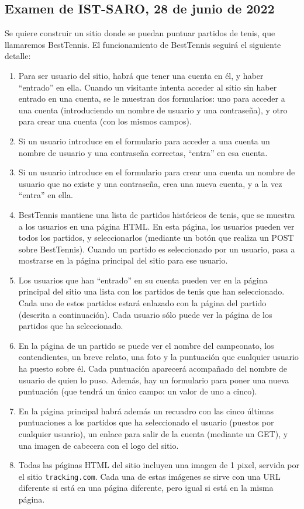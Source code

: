 \subsection{Examen de IST-SARO, 28 de junio de 2022}

Se quiere construir un sitio donde se puedan puntuar partidos de tenis, que llamaremos BestTennis. El funcionamiento de BestTennis seguirá el siguiente detalle:

\begin{enumerate}
\item Para ser usuario del sitio, habrá que tener una cuenta en él, y haber ``entrado'' en ella. Cuando un visitante intenta acceder al sitio sin haber entrado en una cuenta, se le muestran dos formularios: uno para acceder a una cuenta (introduciendo un nombre de usuario y una contraseña), y otro para crear una cuenta (con los mismos campos).
\item Si un usuario introduce en el formulario para acceder a una cuenta un nombre de usuario y una contraseña correctas, ``entra'' en esa cuenta.
\item Si un usuario introduce en el formulario para crear una cuenta un nombre de usuario que no existe y una contraseña, crea una nueva cuenta, y a la vez ``entra'' en ella.
\item BestTennis mantiene una lista de partidos históricos de tenis, que se muestra a los usuarios en una página HTML. En esta página, los usuarios pueden ver todos los partidos, y seleccionarlos (mediante un botón que realiza un POST sobre BestTennis). Cuando un partido es seleccionado por un usuario, pasa a mostrarse en la página principal del sitio para ese usuario.
\item Los usuarios que han ``entrado'' en su cuenta pueden ver en la página principal del sitio una lista con los partidos de tenis que han seleccionado. Cada uno de estos partidos estará enlazado con la página del partido (descrita a continuación). Cada usuario sólo puede ver la página de los partidos que ha seleccionado.
\item En la página de un partido se puede ver el nombre del campeonato, los contendientes, un breve relato, una foto y la puntuación que cualquier usuario ha puesto sobre él. Cada puntuación aparecerá acompañado del nombre de usuario de quien lo puso. Además, hay un formulario para poner una nueva puntuación (que tendrá un único campo: un valor de uno a cinco).
\item En la página principal habrá además un recuadro con las cinco últimas puntuaciones a los partidos que ha seleccionado el usuario (puestos por cualquier usuario), un enlace para salir de la cuenta (mediante un GET), y una imagen de cabecera con el logo del sitio.
\item Todas las páginas HTML del sitio incluyen una imagen de 1 pixel, servida por el sitio \texttt{tracking.com}. Cada una de estas imágenes se sirve con una URL diferente si está en una página diferente, pero igual si está en la misma página.

\end{enumerate}


